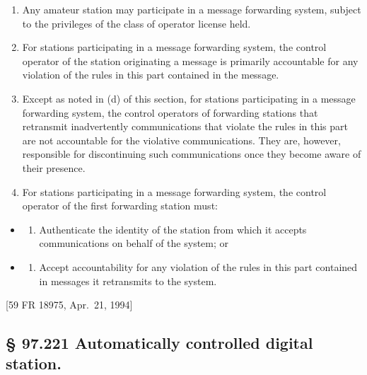 \documentclass[
  letterpaper,
  DIV=11,
  numbers=noendperiod]{scrreport}
\providecommand{\tightlist}{%
  \setlength{\itemsep}{0pt}\setlength{\parskip}{0pt}}\usepackage{longtable,booktabs,array}
\begin{document}
\begin{enumerate}
\def\labelenumi{(\alph{enumi})}
\item
  Any amateur station may participate in a message forwarding system,
  subject to the privileges of the class of operator license held.
\item
  For stations participating in a message forwarding system, the control
  operator of the station originating a message is primarily accountable
  for any violation of the rules in this part contained in the message.
\item
  Except as noted in (d) of this section, for stations participating in
  a message forwarding system, the control operators of forwarding
  stations that retransmit inadvertently communications that violate the
  rules in this part are not accountable for the violative
  communications. They are, however, responsible for discontinuing such
  communications once they become aware of their presence.
\item
  For stations participating in a message forwarding system, the control
  operator of the first forwarding station must:
\end{enumerate}

\begin{itemize}
\item
  \begin{enumerate}
  \def\labelenumi{(\arabic{enumi})}
  \tightlist
  \item
    Authenticate the identity of the station from which it accepts
    communications on behalf of the system; or
  \end{enumerate}
\item
  \begin{enumerate}
  \def\labelenumi{(\arabic{enumi})}
  \setcounter{enumi}{1}
  \tightlist
  \item
    Accept accountability for any violation of the rules in this part
    contained in messages it retransmits to the system.
  \end{enumerate}
\end{itemize}

{[}59 FR 18975, Apr.~21, 1994{]}

\hypertarget{automatically-controlled-digital-station.}{%
\subsection*{§ 97.221 Automatically controlled digital
station.}\label{automatically-controlled-digital-station.}}
\end{document}
